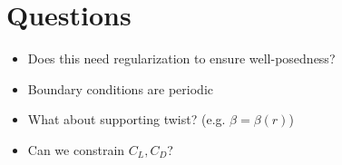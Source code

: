 \documentclass{article}
\begin{document}

\section{Questions}

\begin{itemize}
 \item Does this need regularization to ensure well-posedness?
 \item Boundary conditions are periodic
 \item What about supporting twist? (e.g. $\beta = \beta(r)$)
 \item Can we constrain $C_L, C_D$?
\end{itemize}
\end{document}
